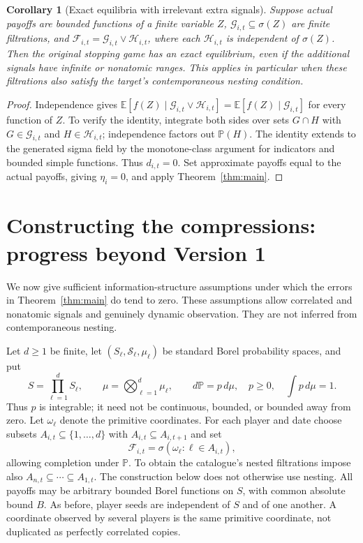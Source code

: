 \documentclass[11pt]{article}
\newtheorem{corollary}[theorem]{Corollary}
\theoremstyle{remark}\newtheorem{remark}[theorem]{Remark}
\newcommand{\E}{\mathbb E}
\newcommand{\Prb}{\mathbb P}
\begin{document}
\begin{corollary}[Exact equilibria with irrelevant extra signals]\label{cor:noise}
Suppose actual payoffs are bounded functions of a finite variable $Z$, $\mathcal G_{i,t}\subseteq\sigma(Z)$ are finite filtrations, and
$\mathcal F_{i,t}=\mathcal G_{i,t}\vee\mathcal H_{i,t}$, where each $\mathcal H_{i,t}$ is independent of $\sigma(Z)$. Then the original stopping game has an exact equilibrium, even if the additional signals have infinite or nonatomic ranges. This applies in particular when these filtrations also satisfy the target's contemporaneous nesting condition.
\end{corollary}
\begin{proof}
Independence gives
$\E[f(Z)\mid\mathcal G_{i,t}\vee\mathcal H_{i,t}]
=\E[f(Z)\mid\mathcal G_{i,t}]$ for every function of $Z$. To verify the identity, integrate both sides over sets $G\cap H$ with $G\in\mathcal G_{i,t}$ and $H\in\mathcal H_{i,t}$; independence factors out $\Prb(H)$. The identity extends to the generated sigma field by the monotone-class argument for indicators and bounded simple functions. Thus $d_{i,t}=0$. Set approximate payoffs equal to the actual payoffs, giving $\eta_i=0$, and apply Theorem~\ref{thm:main}.
\end{proof}


\section*{Constructing the compressions: progress beyond Version 1}
We now give sufficient information-structure assumptions under which the
errors in Theorem~\ref{thm:main} do tend to zero. These assumptions allow
correlated and nonatomic signals and genuinely dynamic observation.
They are not inferred from contemporaneous nesting.

Let $d\geq1$ be finite, let $(S_\ell,\mathcal S_\ell,\mu_\ell)$
be standard Borel probability spaces, and put
\[
 S=\prod_{\ell=1}^d S_\ell,\qquad
 \mu=\bigotimes_{\ell=1}^d\mu_\ell,\qquad
 d\Prb=p\,d\mu,\quad p\geq0,\quad\int p\,d\mu=1.
\]
Thus $p$ is integrable; it need not be continuous, bounded, or bounded
away from zero. Let $\omega_\ell$ denote the primitive coordinates.
For each player and date choose subsets $A_{i,t}\subseteq\{1,\ldots,d\}$
with $A_{i,t}\subseteq A_{i,t+1}$ and set
\[
 \mathcal F_{i,t}=\sigma(\omega_\ell:\ell\in A_{i,t}),
\]
allowing completion under $\Prb$. To obtain the catalogue's nested
filtrations impose also $A_{n,t}\subseteq\cdots\subseteq A_{1,t}$.
The construction below does not otherwise use nesting. All payoffs may
be arbitrary bounded Borel functions on $S$, with common absolute bound
$B$. As before, player seeds are independent of $S$ and of one another.
A coordinate observed by several players is the same primitive
coordinate, not duplicated as perfectly correlated copies.
\end{document}
